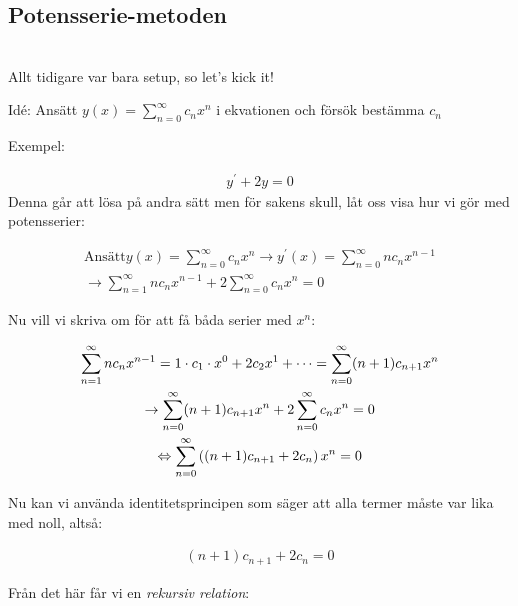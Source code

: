 \subsection{Potensserie-metoden}\hfill\\
\noindent Allt tidigare var bara setup, so let's kick it!
\par\bigskip
\noindent Idé: Ansätt $y(x) = \sum_{n=0}^{\infty}c_nx^n$ i ekvationen och försök bestämma $c_n$
\par\bigskip
\noindent Exempel:

\begin{equation*}
  \begin{gathered}
    y^{\prime} +2y = 0
  \end{gathered}
\end{equation*}
\noindent Denna går att lösa på andra sätt men för sakens skull, låt oss visa hur vi gör med potensserier:


\begin{equation*}
  \begin{gathered}
    \text{Ansätt} y(x) = \sum_{n=0}^{\infty}c_nx^n \rightarrow y^{\prime}(x)=\sum_{n=0}^{\infty}nc_nx^{n-1}\\
    \rightarrow \sum_{n=1}^{\infty}nc_nx^{n-1} + 2\sum_{n=0}^{\infty}c_nx^n = 0
  \end{gathered}
\end{equation*}
\par\bigskip
\noindent Nu vill vi skriva om för att få båda serier med $x^n$:


\begin{equation*}
  \begin{gathered}
    \sum_{n=1}^{\infty}nc_nx^{n-1}=1\cdot c_1\cdot x^0 + 2c_2x^1 + \cdots = \sum_{n=0}^{\infty}(n+1)c_{n+1}x^n\\
    \rightarrow \sum_{n=0}^{\infty}(n+1)c_{n+1}x^n + 2\sum_{n=0}^{\infty}c_nx^n =0\\
    \Leftrightarrow\sum_{n=0}^{\infty}\left((n+1)c_{n+1}+2c_n\right)x^n=0
  \end{gathered}
\end{equation*}
\par\bigskip
\noindent Nu kan vi använda identitetsprincipen som säger att alla termer måste var lika med noll, altså:


\begin{equation*}
  \begin{gathered}
    (n+1)c_{n+1}+2c_n=0
  \end{gathered}
\end{equation*}
\par\bigskip
\noindent Från det här får vi en \textit{rekursiv relation}:


